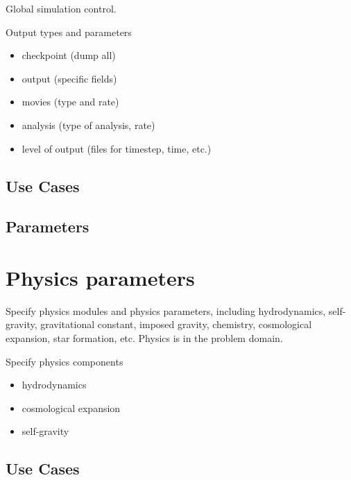 \documentclass{book}
\begin{document}
Global simulation control.

Output types and parameters

\begin{itemize}
\item checkpoint (dump all)
\item output (specific fields)
\item movies (type and rate)
\item analysis (type of analysis, rate)
\item level of output (files for timestep, time, etc.)
\end{itemize}

\subsection{Use Cases}
\subsection{Parameters}

\section{Physics parameters} \label{s:physics}

Specify physics modules and physics parameters, including
hydrodynamics, self-gravity, gravitational constant, imposed gravity,
chemistry, cosmological expansion, star formation, etc.  Physics is in
the problem domain.

Specify physics components

\begin{itemize}
\item hydrodynamics
\item  cosmological expansion
\item self-gravity
\end{itemize}

\subsection{Use Cases}
\end{document}
